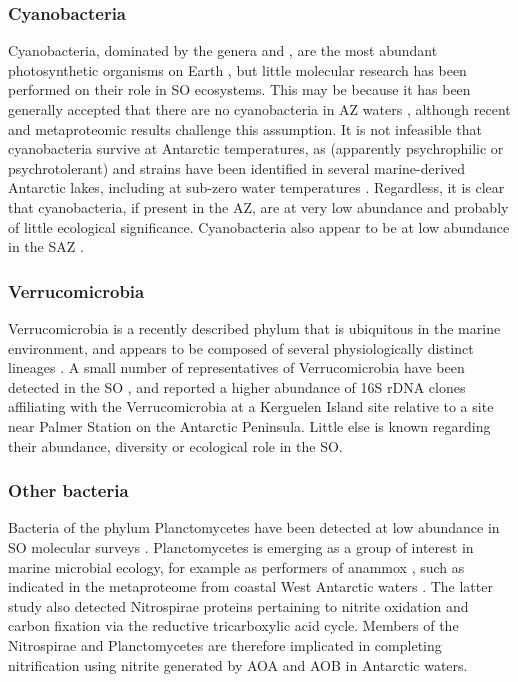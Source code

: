 \subsubsection{Cyanobacteria}

Cyanobacteria, dominated by the genera  and , are the most abundant photosynthetic organisms on Earth \citep[][and references therein]{Scanlan:2009cw}, but little molecular research has been performed on their role in \ac{SO} ecosystems.
This may be because it has been generally accepted that there are no cyanobacteria in \ac{AZ} waters \cite{Ghiglione:2011ee,Zubkov:1998uf,Evans:2011ih}, although recent and metaproteomic results \cite{Williams:2012bs} challenge this assumption.
It is not infeasible that cyanobacteria survive at Antarctic temperatures, as (apparently psychrophilic or psychrotolerant)  and  strains have been identified in several marine-derived Antarctic lakes, including at sub-zero water temperatures \cite{Bowman:2000ef,Powell:2005uh,Lauro:2010jna}.
Regardless, it is clear that cyanobacteria, if present in the \ac{AZ}, are at very low abundance and probably of little ecological significance.
Cyanobacteria also appear to be at low abundance in the \ac{SAZ} \cite{Abell:2005ji,Topping:2006ul}.  

\subsubsection{Verrucomicrobia}

Verrucomicrobia is a recently described phylum that is ubiquitous in the marine environment, and appears to be composed of several physiologically distinct lineages \cite{Freitas:2012jz}.
A small number of representatives of Verrucomicrobia have been detected in the \ac{SO} \cite{Murray:2011ib,West:2008kc,Gentile:2006ef,Murray:2007db}, and \citet{Ghiglione:2011ee} reported a higher abundance of 16S rDNA clones affiliating with the Verrucomicrobia at a Kerguelen Island site relative to a site near Palmer Station on the Antarctic Peninsula.
Little else is known regarding their abundance, diversity or ecological role in the \ac{SO}.

\subsubsection{Other bacteria}

Bacteria of the phylum Planctomycetes have been detected at low abundance in \ac{SO} molecular surveys \cite{Gentile:2006ef,LopezGarcia:2001vp,Jamieson:2012up,Murray:2011ib,Abell:2005ji}.
Planctomycetes is emerging as a group of interest in marine microbial ecology, for example as performers of \ac{anammox} \cite{Strous:1999wj}, such as indicated in the metaproteome from coastal West Antarctic waters \cite{Williams:2012bs}.
The latter study also detected Nitrospirae proteins pertaining to nitrite oxidation and carbon fixation via the reductive tricarboxylic acid cycle.
Members of the Nitrospirae and Planctomycetes are therefore implicated in completing nitrification using nitrite generated by AOA and AOB in Antarctic waters.


